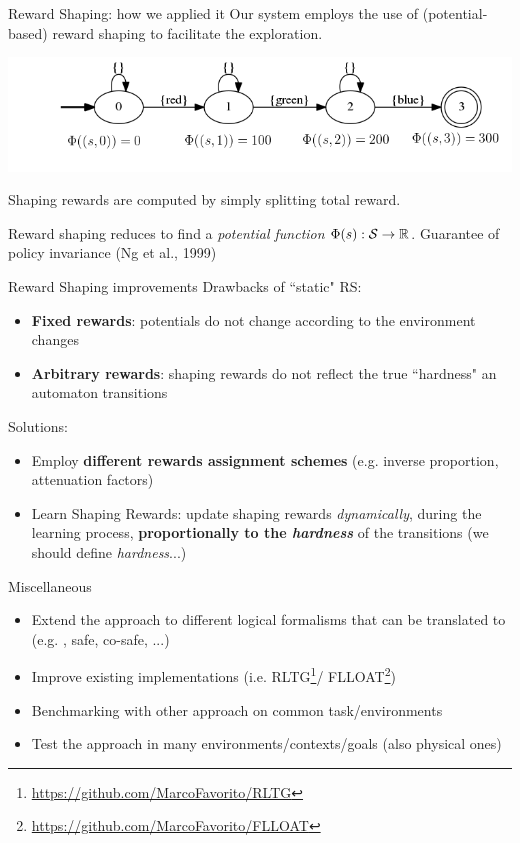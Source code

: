 \documentclass{beamer}
\begin{document}
\begin{frame}{Reward Shaping: how we applied it}
	Our system employs the use of (potential-based) reward shaping to facilitate the exploration.
	
	\begin{center}
		\includegraphics[width=\textwidth]{images/sapientino-simple-dfa-horizontal-with-potentials}
	\end{center}
	
	Shaping rewards are computed by simply splitting total reward.\\
	
	\vspace{0.3cm}
	
	Reward shaping reduces to find a \emph{potential function} $\Phi(s):\S \to \mathbb{R}$. Guarantee of policy invariance (Ng et al., 1999)
\end{frame}

\begin{frame}{Reward Shaping improvements}
	Drawbacks of ``static" RS:
	\begin{itemize}
		\item \textbf{Fixed rewards}: potentials do not change according to the environment changes
		\item \textbf{Arbitrary rewards}: shaping rewards do not reflect the true ``hardness" an automaton transitions
	\end{itemize}
	
	Solutions:
	\begin{itemize}
		\item Employ \textbf{different rewards assignment schemes} (e.g. inverse proportion, attenuation factors)
		\item Learn Shaping Rewards: update shaping rewards \emph{dynamically}, during the learning process, \textbf{proportionally to the \emph{hardness}} of the transitions (we should define \emph{hardness}...)
	\end{itemize}
\end{frame}
	
\begin{frame}{Miscellaneous}
	\begin{itemize}
		\item Extend the approach to different logical formalisms that can be translated to \DFA (e.g. \PLTL, \LTL safe, \LTL co-safe, ...)
		\item Improve existing implementations (i.e. RLTG\footnote{\url{https://github.com/MarcoFavorito/RLTG}}/ FLLOAT\footnote{\url{https://github.com/MarcoFavorito/FLLOAT}})
		\item Benchmarking with other approach on common task/environments
		\item Test the approach in many environments/contexts/goals (also physical ones)
	\end{itemize}

\end{frame}
\end{document}
